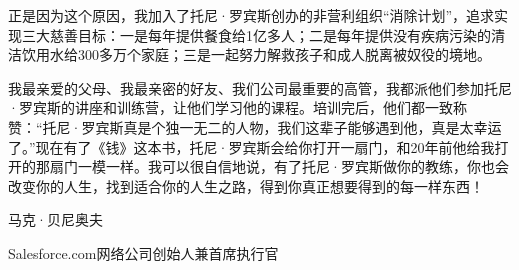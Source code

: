 正是因为这个原因，我加入了托尼·罗宾斯创办的非营利组织“消除计划”，追求实现三大慈善目标：一是每年提供餐食给1亿多人；二是每年提供没有疾病污染的清洁饮用水给300多万个家庭；三是一起努力解救孩子和成人脱离被奴役的境地。

我最亲爱的父母、我最亲密的好友、我们公司最重要的高管，我都派他们参加托尼·罗宾斯的讲座和训练营，让他们学习他的课程。培训完后，他们都一致称赞：“托尼·罗宾斯真是个独一无二的人物，我们这辈子能够遇到他，真是太幸运了。”现在有了《钱》这本书，托尼·罗宾斯会给你打开一扇门，和20年前他给我打开的那扇门一模一样。我可以很自信地说，有了托尼·罗宾斯做你的教练，你也会改变你的人生，找到适合你的人生之路，得到你真正想要得到的每一样东西！

{\kaishu \hfill 马克·贝尼奥夫

\hfill Salesforce.com网络公司创始人兼首席执行官}
